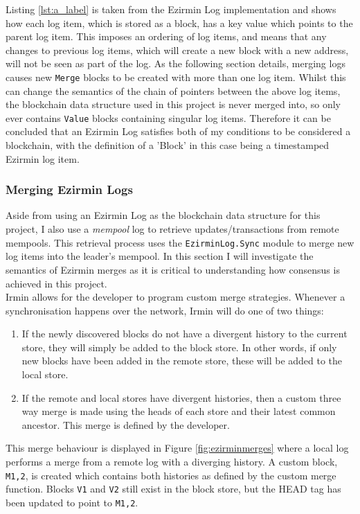\documentclass[12pt,a4paper,twoside,openright]{report}
\begin{document}
	Listing \ref{lst:a_label} is taken from the Ezirmin Log implementation and shows how each log item, which is stored as a block, has a key value which points to the parent log item. 
	This imposes an ordering of log items, and means that any changes to previous log items, which will create a new block with a new address, will not be seen as part of the log. 
	As the following section details, merging logs causes new \texttt{Merge} blocks to be created with more than one log item.
	Whilst this can change the semantics of the chain of pointers between the above log items, the blockchain data structure used in this project is never merged into, so only ever contains \texttt{Value} blocks containing singular log items.
	Therefore it can be concluded that an Ezirmin Log satisfies both of my conditions to be considered a blockchain, with the definition of a 'Block' in this case being a timestamped Ezirmin log item.

	\subsubsection*{Merging Ezirmin Logs}
	Aside from using an Ezirmin Log as the blockchain data structure for this project, I also use a \textit{mempool} log to retrieve updates/transactions from remote mempools. 
	This retrieval process uses the \texttt{EzirminLog.Sync} module to merge new log items into the leader's mempool.
	In this section I will investigate the semantics of Ezirmin merges as it is critical to understanding how consensus is achieved in this project.\\
	
	Irmin allows for the developer to program custom merge strategies. 
	Whenever a synchronisation happens over the network, Irmin will do one of two things:
	\begin{enumerate}
		\item If the newly discovered blocks do not have a divergent history to the current store, they will simply be added to the block store. 
			In other words, if only new blocks have been added in the remote store, these will be added to the local store. 
		\item If the remote and local stores have divergent histories, then a custom three way merge is made using the heads of each store and their latest common ancestor.
		This merge is defined by the developer.
	\end{enumerate}
	This merge behaviour is displayed in Figure \ref{fig:ezirminmerges} where a local log performs a merge from a remote log with a diverging history.
	A custom block, \texttt{M1,2}, is created which contains both histories as defined by the custom merge function. 
	Blocks \texttt{V1} and \texttt{V2} still exist in the block store, but the HEAD tag has been updated to point to \texttt{M1,2}. \\
\end{document}
